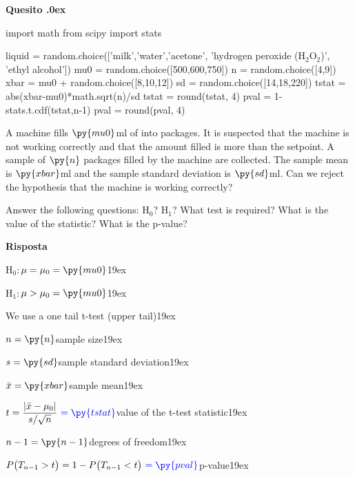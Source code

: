 \documentclass[11pt,twoside,a4paper]{article}
\newcounter{quesito}
\newenvironment{question}{\bigskip\addtocounter{quesito}{1}\bigskip\bigskip\par\textbf{Quesito \thequesito.\kern0ex}}{\par\vspace{\parskip}}
\newenvironment{answer}{\par\textbf{Risposta\quad}}{\par\vspace{\parskip}}
\begin{document}
\begin{question}
\begin{pycode}
import math
from scipy import stats

liquid = random.choice(['milk','water','acetone', 'hydrogen peroxide (H$_2$O$_2$)', 'ethyl alcohol'])
mu0 = random.choice([500,600,750])
n = random.choice([4,9])
xbar = mu0 + random.choice([8,10,12])
sd = random.choice([14,18,220])
tstat = abs(xbar-mu0)*math.sqrt(n)/sd
tstat = round(tstat, 4)
pval = 1-stats.t.cdf(tstat,n-1)
pval = round(pval, 4)
\end{pycode}
A machine fills $\py{mu0}$ml of  into packages. It is suspected that the machine is not working correctly and that the amount filled is more than the setpoint. A sample of $\py{n}$ packages filled by the machine are collected. The sample mean is $\py{xbar}$ml and the sample standard deviation is $\py{sd}$ml. Can we reject the hypothesis that the machine is working correctly?

Answer the following questions: H$_0$? H$_1$? What test is required? What is the value of the statistic? What is the p-value? 


\begin{answer}

  H$_0:$\hfill $\mu = \mu_0 = \py{mu0}$\kern19ex
  
  H$_1:$\hfill $\mu>\mu_0 = \py{mu0}$\kern19ex
  
  We use a one tail t-test (upper tail)\kern19ex
  
  $n = \py{n}$\hfill sample size\kern19ex
  
  $s = \py{sd}$\hfill sample standard deviation\kern19ex
  
  $\bar{x} = \py{xbar}$\hfill sample mean\kern19ex
  
  $t = \displaystyle\frac{|\bar{x}-\mu_0|}{s/\sqrt{n}}\ {\color{blue} = \py{tstat}}$\hfill value of the t-test statistic\kern19ex
  
  $n-1 = \py{n-1}$\hfill degrees of freedom\kern19ex
  
  $P\big(T_{n-1}>t\big) = 1- P\big(T_{n-1}<t\big)\ {\color{blue} = \py{pval}}$\hfill p-value\kern19ex

\end{answer}
\end{question}
\end{document}

